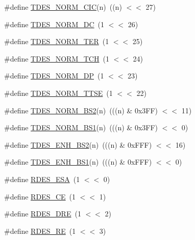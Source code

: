 \begin{DoxyCompactItemize}
\item 
\#define \hyperlink{group___e_n_e_t__18_x_x__43_x_x_ga2ec013767900d7b190e785c9a4a57aac}{T\+D\+E\+S\+\_\+\+N\+O\+R\+M\+\_\+\+C\+IC}(n)~((n) $<$$<$ 27)
\item 
\#define \hyperlink{group___e_n_e_t__18_x_x__43_x_x_ga18424e2fffc40b2d3799a61ecd23292d}{T\+D\+E\+S\+\_\+\+N\+O\+R\+M\+\_\+\+DC}~(1 $<$$<$ 26)
\item 
\#define \hyperlink{group___e_n_e_t__18_x_x__43_x_x_gac680d00454fa37169be41e38e2188dbe}{T\+D\+E\+S\+\_\+\+N\+O\+R\+M\+\_\+\+T\+ER}~(1 $<$$<$ 25)
\item 
\#define \hyperlink{group___e_n_e_t__18_x_x__43_x_x_ga54a1e80f1f2aaca4dc926295ab25a5c4}{T\+D\+E\+S\+\_\+\+N\+O\+R\+M\+\_\+\+T\+CH}~(1 $<$$<$ 24)
\item 
\#define \hyperlink{group___e_n_e_t__18_x_x__43_x_x_ga68df1378871eaf9b4131844caa0130e2}{T\+D\+E\+S\+\_\+\+N\+O\+R\+M\+\_\+\+DP}~(1 $<$$<$ 23)
\item 
\#define \hyperlink{group___e_n_e_t__18_x_x__43_x_x_ga658ec604ac367e4fee89636fda9407b6}{T\+D\+E\+S\+\_\+\+N\+O\+R\+M\+\_\+\+T\+T\+SE}~(1 $<$$<$ 22)
\item 
\#define \hyperlink{group___e_n_e_t__18_x_x__43_x_x_ga66c80103a6bb8a55e106a9ee04f8ec9c}{T\+D\+E\+S\+\_\+\+N\+O\+R\+M\+\_\+\+B\+S2}(n)~(((n) \& 0x3\+F\+F) $<$$<$ 11)
\item 
\#define \hyperlink{group___e_n_e_t__18_x_x__43_x_x_gafe15d825fd37cfb622ada791a26473be}{T\+D\+E\+S\+\_\+\+N\+O\+R\+M\+\_\+\+B\+S1}(n)~(((n) \& 0x3\+F\+F) $<$$<$ 0)
\item 
\#define \hyperlink{group___e_n_e_t__18_x_x__43_x_x_ga73c2ca76141778f5b5295fa488cb4336}{T\+D\+E\+S\+\_\+\+E\+N\+H\+\_\+\+B\+S2}(n)~(((n) \& 0x\+F\+F\+F) $<$$<$ 16)
\item 
\#define \hyperlink{group___e_n_e_t__18_x_x__43_x_x_ga3faccf9a5f5bc2dcf47a52fcac3ab7ab}{T\+D\+E\+S\+\_\+\+E\+N\+H\+\_\+\+B\+S1}(n)~(((n) \& 0x\+F\+F\+F) $<$$<$ 0)
\item 
\#define \hyperlink{group___e_n_e_t__18_x_x__43_x_x_gac42ad836f93c298582695d486cfb0a9b}{R\+D\+E\+S\+\_\+\+E\+SA}~(1 $<$$<$ 0)
\item 
\#define \hyperlink{group___e_n_e_t__18_x_x__43_x_x_gaaf50c6efd3f84a1a22008f987a98bb8b}{R\+D\+E\+S\+\_\+\+CE}~(1 $<$$<$ 1)
\item 
\#define \hyperlink{group___e_n_e_t__18_x_x__43_x_x_ga173952a76d2b223dacfe8b34f44c2a92}{R\+D\+E\+S\+\_\+\+D\+RE}~(1 $<$$<$ 2)
\item 
\#define \hyperlink{group___e_n_e_t__18_x_x__43_x_x_ga449e152a018ace4c803c5e523f738455}{R\+D\+E\+S\+\_\+\+RE}~(1 $<$$<$ 3)

\end{DoxyCompactItemize}
